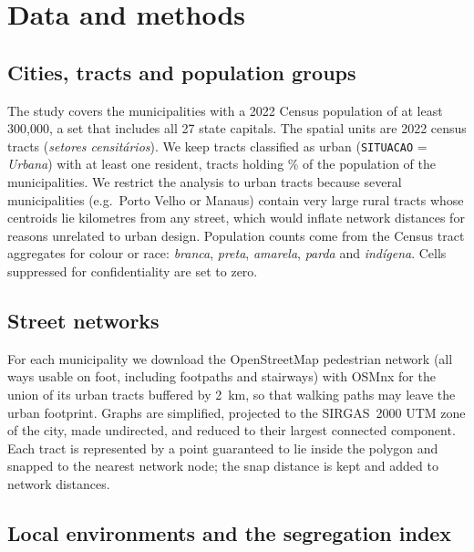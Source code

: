 \section{Data and methods}\label{sec:methods}

\subsection{Cities, tracts and population groups}

The study covers the \nCities{} municipalities with a 2022 Census population of at least 300,000, a set that
includes all 27 state capitals. The spatial units are 2022 census tracts (\emph{setores censit\'arios}). We keep
tracts classified as urban (\texttt{SITUACAO} = \emph{Urbana}) with at least one resident, \nTractsUrban{} tracts
holding \sharePopUrban\% of the population of the \nCities{} municipalities. We restrict the analysis to urban
tracts because several municipalities (e.g.\ Porto Velho or Manaus) contain very large rural tracts whose
centroids lie kilometres from any street, which would inflate network distances for reasons unrelated to urban
design. Population counts come from the Census tract aggregates for colour or race: \emph{branca}, \emph{preta},
\emph{amarela}, \emph{parda} and \emph{ind\'igena}. Cells suppressed for confidentiality are set to zero.

\subsection{Street networks}

For each municipality we download the OpenStreetMap pedestrian network (all ways usable on foot, including
footpaths and stairways) with OSMnx \citep{boeing2017osmnx} for the union of its urban tracts buffered by 2~km, so
that walking paths may leave the urban footprint. Graphs are simplified, projected to the SIRGAS~2000 UTM zone of
the city, made undirected, and reduced to their largest connected component. Each tract is represented by a
point guaranteed to lie inside the polygon and snapped to the nearest network node; the snap distance is kept and
added to network distances.

\subsection{Local environments and the segregation index}

